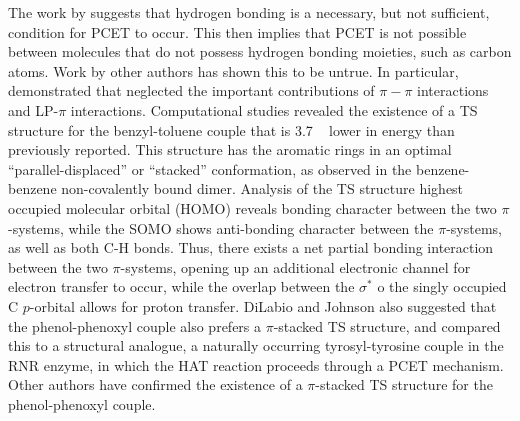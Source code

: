 \begin{doublespace}
The work by \citet{Mayer2002} suggests that hydrogen bonding is a necessary, but
not sufficient, condition for PCET to occur. This then implies that PCET is not
possible between molecules that do not possess hydrogen bonding moieties, such
as carbon atoms. Work by other authors has shown this to be
untrue.\cite{Hatcher2007, DiLabio2007} In particular, \citet{DiLabio2007}
demonstrated that \citet{Mayer2002} neglected the important contributions of
$\pi-\pi$ interactions and LP-$\pi$ interactions. Computational studies revealed
the existence of a TS structure for the benzyl-toluene couple that is 3.7
\kcalmol~ lower in energy than previously reported. This structure has the
aromatic rings in an optimal ``parallel-displaced'' or ``stacked'' conformation,
as observed in the benzene-benzene non-covalently bound
dimer.\cite{Sinnokrot2002} Analysis of the TS structure highest occupied
molecular orbital (HOMO) reveals bonding character between the two
$\pi$-systems, while the SOMO shows anti-bonding character between the
$\pi$-systems, as well as both C-H bonds. Thus, there exists a net partial
bonding interaction between the two $\pi$-systems, opening up an additional
electronic channel for electron transfer to occur, while the overlap between the
 $\sigma^*$ o the singly occupied C $p$-orbital allows for proton
transfer. DiLabio and Johnson also
suggested that the phenol-phenoxyl couple also prefers a $\pi$-stacked TS
structure, and compared this to a structural analogue, a naturally occurring
tyrosyl-tyrosine couple in the RNR enzyme, in which the HAT reaction proceeds
through a PCET mechanism. Other authors have confirmed the existence of a
$\pi$-stacked TS structure for the phenol-phenoxyl couple.\cite{Sirjoosingh2011,
HammesSchiffer2015, MunozRugeles2017}


\end{doublespace}
